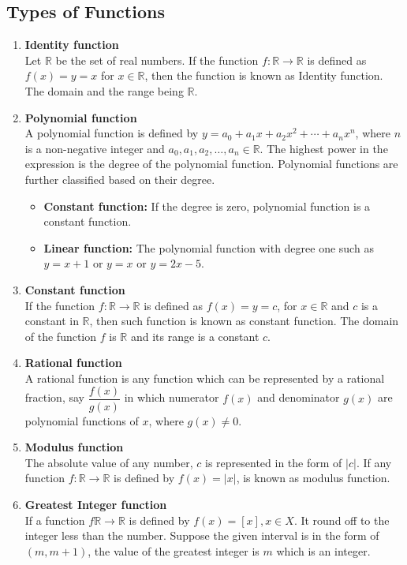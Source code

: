 \documentclass[11pt]{report}
\newcommand{\bt}[1]{\textbf{#1}}
\newcommand{\real}{ \mathbb{R}}
\begin{document}
	\subsection{Types of Functions}
	\begin{enumerate}
		\item \bt{Identity function}\\
		Let $\real$ be the set of real numbers. If the function $f:\real\rightarrow\real$ is defined as $f(x)=y=x$ for $x\in \real$, then the function is known as Identity function. The domain  and the range being $\real$.
		
		\item \bt{Polynomial function}\\
		A polynomial function is defined by $y=a_0 + a_1x + a_2x^2 + \cdots + a_nx^n$, where $n$ is a non-negative integer and $a_0, a_1, a_2,\ldots,a_n \in \real$. The highest power in the expression is the degree of the polynomial function. Polynomial functions are further classified based on their degree.
		\begin{itemize}
			\item \bt{Constant function:} If the degree is zero, polynomial function is a constant function.
			\item \bt{Linear function:} The polynomial function with degree one such as $y=x+1$ or $y=x$ or $y=2x-5$.
		\end{itemize}
	
		\item \bt{Constant function}\\
		If the function $f:\real\rightarrow\real$ is defined as $f(x)=y=c$, for $x\in\real$ and $c$ is a constant in $\real$, then such function is known as constant function. The domain of the function $f$ is $\real$ and its range is a constant $c$.
	
		\item \bt{Rational function}\\
		A rational function is any function which can be represented by a rational fraction, say $\dfrac{f(x)}{g(x)}$ in which numerator $f(x)$ and denominator $g(x)$ are polynomial functions of $x$, where $g(x) \neq 0$.
		
		\item \bt{Modulus function}\\
		The absolute value of any number, $c$ is represented in the form of $|c|$. If any function $f:\real\rightarrow\real$ is defined by $f(x)=|x|$, is known as modulus function.
		
		\item \bt{Greatest Integer function}\\
		If a function $f\real\rightarrow\real$ is defined by $f(x)=[x], x\in X$. It round off to the integer less than the number. Suppose the given interval is in the form of $(m,m+1)$, the value of the greatest integer is $m$ which is an integer.
		

\end{enumerate}
\end{document}
